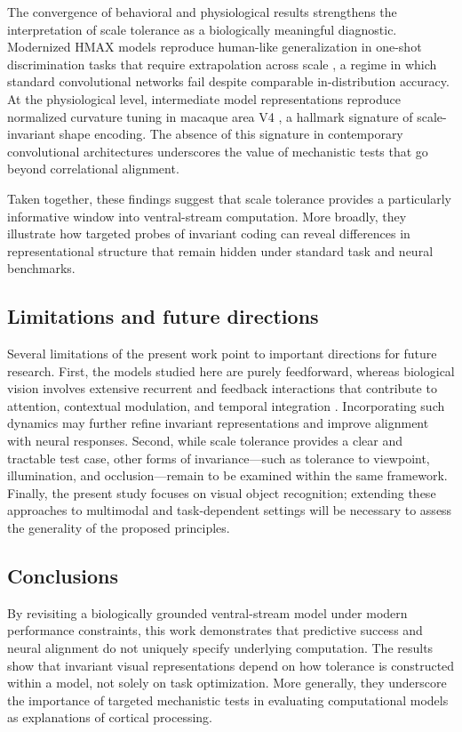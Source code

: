 \documentclass[pdflatex,sn-nature]{sn-jnl}
\begin{document}
The convergence of behavioral and physiological results strengthens the interpretation of scale tolerance as a biologically meaningful diagnostic. Modernized HMAX models reproduce human-like generalization in one-shot discrimination tasks that require extrapolation across scale \citep{Han2020}, a regime in which standard convolutional networks fail despite comparable in-distribution accuracy. At the physiological level, intermediate model representations reproduce normalized curvature tuning in macaque area V4 \citep{ElShamayleh2016Curvature}, a hallmark signature of scale-invariant shape encoding. The absence of this signature in contemporary convolutional architectures underscores the value of mechanistic tests that go beyond correlational alignment.

Taken together, these findings suggest that scale tolerance provides a particularly informative window into ventral-stream computation. More broadly, they illustrate how targeted probes of invariant coding can reveal differences in representational structure that remain hidden under standard task and neural benchmarks.

\subsection{Limitations and future directions}

Several limitations of the present work point to important directions for future research. First, the models studied here are purely feedforward, whereas biological vision involves extensive recurrent and feedback interactions that contribute to attention, contextual modulation, and temporal integration \citep{DiCarlo2012}. Incorporating such dynamics may further refine invariant representations and improve alignment with neural responses. Second, while scale tolerance provides a clear and tractable test case, other forms of invariance—such as tolerance to viewpoint, illumination, and occlusion—remain to be examined within the same framework. Finally, the present study focuses on visual object recognition; extending these approaches to multimodal and task-dependent settings will be necessary to assess the generality of the proposed principles.

\subsection{Conclusions}

By revisiting a biologically grounded ventral-stream model under modern performance constraints, this work demonstrates that predictive success and neural alignment do not uniquely specify underlying computation. The results show that invariant visual representations depend on how tolerance is constructed within a model, not solely on task optimization. More generally, they underscore the importance of targeted mechanistic tests in evaluating computational models as explanations of cortical processing.
\end{document}
